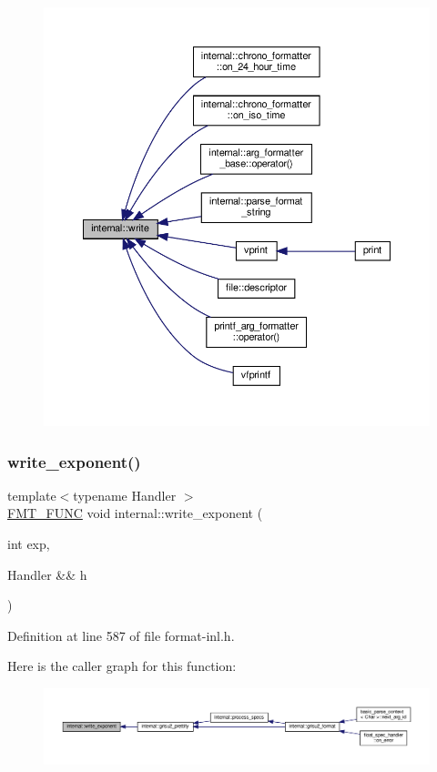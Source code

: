 \begin{figure}[H]
\begin{center}
\leavevmode
\includegraphics[width=350pt]{namespaceinternal_a1d6eb1d297ebb5fc0f724732f23b22eb_icgraph}
\end{center}
\end{figure}
\mbox{\label{namespaceinternal_a580207e19bc8ef3c099ccc3154f1e8d6}} 
\subsubsection{\texorpdfstring{write\+\_\+exponent()}{write\_exponent()}}
{\footnotesize\ttfamily template$<$typename Handler $>$ \\
\hyperlink{format_8h_a02c8898388e0ae59aab58be14fcd4e05}{F\+M\+T\+\_\+\+F\+U\+NC} void internal\+::write\+\_\+exponent (\begin{DoxyParamCaption}\item[{int}]{exp,  }\item[{Handler \&\&}]{h }\end{DoxyParamCaption})}



Definition at line 587 of file format-\/inl.\+h.

Here is the caller graph for this function\+:
\nopagebreak
\begin{figure}[H]
\begin{center}
\leavevmode
\includegraphics[width=350pt]{namespaceinternal_a580207e19bc8ef3c099ccc3154f1e8d6_icgraph}
\end{center}
\end{figure}
